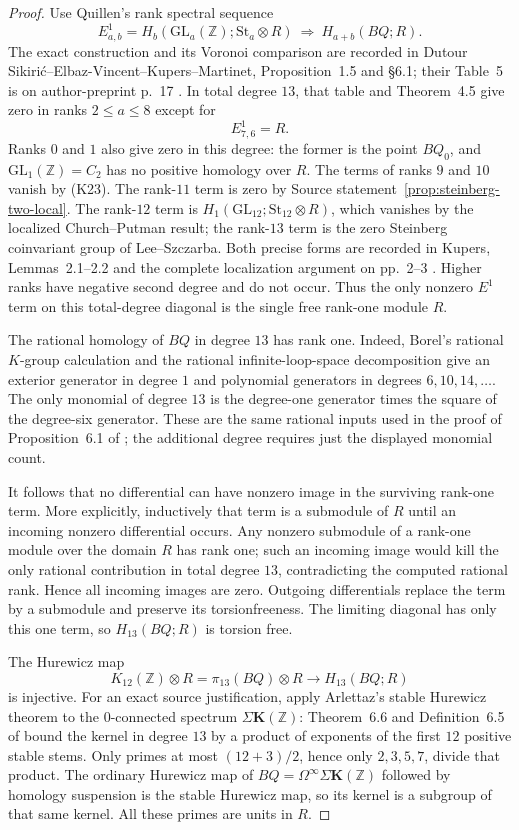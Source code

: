 \documentclass[11pt,a4paper]{article}
\theoremstyle{definition}
\begin{document}
\begin{proof}
Use Quillen's rank spectral sequence
\[
 E^1_{a,b}=H_b(\mathrm{GL}_a(\mathbb Z);\mathrm{St}_a\otimes R)
 \ \Longrightarrow\ H_{a+b}(BQ;R).
\]
The exact construction and its Voronoi comparison are recorded in
Dutour Sikiri\'c--Elbaz-Vincent--Kupers--Martinet,
Proposition~1.5 and \S6.1; their Table~5 is on author-preprint p.~17
\cite{DEKM2026}. In total degree $13$, that table and
Theorem~4.5 give zero in ranks $2\le a\le8$ except for
\[
 E^1_{7,6}=R.
\]
Ranks $0$ and $1$ also give zero in this degree: the former is the
point $BQ_0$, and $\mathrm{GL}_1(\mathbb Z)=C_2$ has no positive
homology over $R$. The terms of ranks $9$ and $10$ vanish by (K23). The rank-$11$
term is zero by Source statement~\ref{prop:steinberg-two-local}.
The rank-$12$ term is $H_1(\mathrm{GL}_{12};\mathrm{St}_{12}\otimes R)$,
which vanishes by the localized Church--Putman result; the rank-$13$
term is the zero Steinberg coinvariant group of Lee--Szczarba.
Both precise forms are recorded in Kupers, Lemmas~2.1--2.2 and the
complete localization argument on pp.~2--3
\cite{Kupers2019}. Higher ranks have negative second degree and do
not occur. Thus the only nonzero $E^1$ term on this total-degree
diagonal is the single free rank-one module $R$.

The rational homology of $BQ$ in degree $13$ has rank one.
Indeed, Borel's rational $K$-group calculation and the rational
infinite-loop-space decomposition give an exterior generator in
degree $1$ and polynomial generators in degrees $6,10,14,\ldots$.
The only monomial of degree $13$ is the degree-one generator times
the square of the degree-six generator. These are the same rational
inputs used in the proof of Proposition~6.1 of
\cite{DEKM2026}; the additional degree requires just the
displayed monomial count.

It follows that no differential can have nonzero image in the
surviving rank-one term. More explicitly, inductively that term is
a submodule of $R$ until an incoming nonzero differential occurs.
Any nonzero submodule of a rank-one module over the domain $R$ has
rank one; such an incoming image would kill the only rational
contribution in total degree $13$, contradicting the computed
rational rank. Hence all incoming images are zero. Outgoing
differentials replace the term by a submodule and preserve its
torsionfreeness. The limiting diagonal has only this one term, so
$H_{13}(BQ;R)$ is torsion free.

The Hurewicz map
\[
 K_{12}(\mathbb Z)\otimes R
   =\pi_{13}(BQ)\otimes R\longrightarrow H_{13}(BQ;R)
\]
is injective. For an exact source justification, apply Arlettaz's
stable Hurewicz theorem to the $0$-connected spectrum
$\Sigma\mathbf K(\mathbb Z)$: Theorem~6.6 and Definition~6.5 of
\cite[pp.~40--42]{Arlettaz2000} bound the kernel in degree $13$
by a product of exponents of the first $12$ positive stable stems.
Only primes at most $(12+3)/2$, hence only $2,3,5,7$, divide that
product. The ordinary Hurewicz map of
$BQ=\Omega^\infty\Sigma\mathbf K(\mathbb Z)$ followed by homology
suspension is the stable Hurewicz map, so its kernel is a subgroup
of that same kernel. All these primes are units in $R$.


\end{proof}
\end{document}
